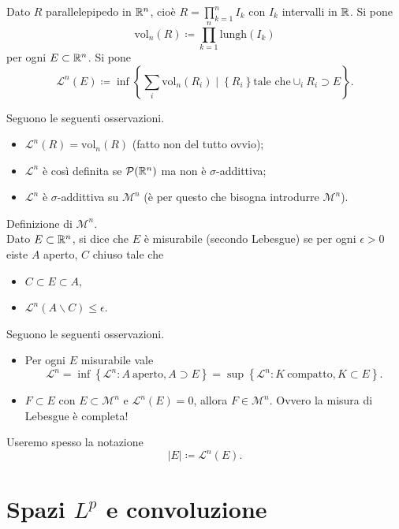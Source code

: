 \documentclass[a4paper, 11pt]{report}
\begin{document}
Dato $R$ parallelepipedo in $\mathbb R^n$, cioè $R = \prod_{k=1}^{n} I_k $ con $I_k$ intervalli in $\mathbb R$.
Si pone
\[
\mathrm{vol}_n (R) \coloneqq \prod_{k=1}^{n}  \mathrm{lungh} (I_k)
\] 
per ogni $E \subset \mathbb R^n$. Si pone
\[
\mathcal{L}^n(E) \coloneqq \inf \left\{ \sum_{i}^{} \mathrm{vol}_n (R_i) \mid \left\{ R_i \right\} \text{tale che} \cup_i R_i \supset E  \right\}.
\] 
\begin{osservazione}
Seguono le seguenti osservazioni.
\begin{itemize}
\item $\mathcal{L}^n(R) = \mathrm{vol}_n (R)$ (fatto non del tutto ovvio);
\item $\mathcal{L}^n$ è così definita se $\mathcal{P}(\mathbb R^n)$ ma non è $\sigma$-addittiva;
\item $\mathcal{L}^n$ è $\sigma$-addittiva su $\mathcal{M}^n$ (è per questo che bisogna introdurre $\mathcal{M}^n$).
\end{itemize}
\end{osservazione}
%
Definizione di $\mathcal{M}^n$. \\
Dato $E \subset \mathbb R^n$, si dice che $E$ è misurabile (secondo Lebesgue) se per ogni $\epsilon > 0$ eiste $A$ aperto, $C$ chiuso tale che
\begin{itemize}
\item $C \subset E \subset A$,
\item $\mathcal{L}^n (A \smallsetminus C) \leq \epsilon$.
\end{itemize}
%
\begin{osservazione}
Seguono le seguenti osservazioni.
\begin{itemize}
\item Per ogni $E$ misurabile vale
\[
\mathcal{L}^n = \inf \left\{ \mathcal{L}^n \colon A \ \text{aperto}, A \supset E \right\} = \sup \left\{ \mathcal{L}^n \colon K \ \text{compatto}, K \subset E \right\}.
\] 
\item $F \subset E$ con $E \subset \mathcal{M}^n$ e $\mathcal{L}^n(E) = 0$, allora $F \in \mathcal{M}^n$. Ovvero la misura di Lebesgue è completa!
\end{itemize}
%
Useremo spesso la notazione
\[
\left| E \right| \coloneqq \mathcal{L}^n (E).
\] 
\end{osservazione}

\chapter{Spazi $L^p$ e convoluzione}

\end{document}
